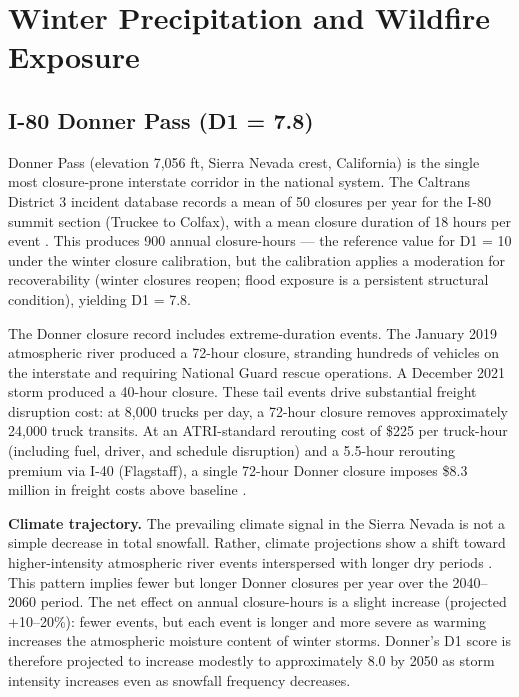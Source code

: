 \section{Winter Precipitation and Wildfire Exposure}

\subsection{I-80 Donner Pass (D1 = 7.8)}

Donner Pass (elevation 7,056 ft, Sierra Nevada crest, California) is the single most
closure-prone interstate corridor in the national system. The Caltrans District 3 incident
database records a mean of 50 closures per year for the I-80 summit section
(Truckee to Colfax), with a mean closure duration of 18 hours per event
\citep{Caltrans2023}. This produces 900 annual closure-hours --- the reference value
for D1 = 10 under the winter closure calibration, but the calibration applies a
moderation for recoverability (winter closures reopen; flood exposure is a persistent
structural condition), yielding D1 = 7.8.

The Donner closure record includes extreme-duration events. The January 2019 atmospheric
river produced a 72-hour closure, stranding hundreds of vehicles on the interstate and
requiring National Guard rescue operations. A December 2021 storm produced a 40-hour
closure. These tail events drive substantial freight disruption cost: at 8,000 trucks per
day, a 72-hour closure removes approximately 24,000 truck transits. At an ATRI-standard
rerouting cost of \$225 per truck-hour (including fuel, driver, and schedule disruption)
and a 5.5-hour rerouting premium via I-40 (Flagstaff), a single 72-hour Donner closure
imposes \$8.3 million in freight costs above baseline \citep{ATRI_costs2024}.

\textbf{Climate trajectory.} The prevailing climate signal in the Sierra Nevada is not
a simple decrease in total snowfall. Rather, climate projections show a shift toward
higher-intensity atmospheric river events interspersed with longer dry periods
\citep{NOAA_SLR2022}. This pattern implies fewer but longer Donner closures per year
over the 2040--2060 period. The net effect on annual closure-hours is a slight increase
(projected +10--20\%): fewer events, but each event is longer and more severe as warming
increases the atmospheric moisture content of winter storms. Donner's D1 score is
therefore projected to increase modestly to approximately 8.0 by 2050 as storm intensity
increases even as snowfall frequency decreases.

